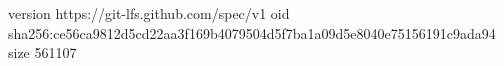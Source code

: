version https://git-lfs.github.com/spec/v1
oid sha256:ce56ca9812d5cd22aa3f169b4079504d5f7ba1a09d5e8040e75156191c9ada94
size 561107

